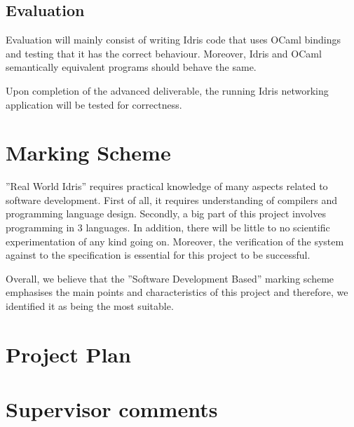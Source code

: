 \documentclass[a4paper]{report}
\begin{document}
\subsection{Evaluation}
Evaluation will mainly consist of writing Idris code that uses OCaml bindings
and testing that it has the correct behaviour.
Moreover, Idris and OCaml semantically equivalent programs should behave
the same.

Upon completion of the advanced deliverable, the running Idris networking
application will be tested for correctness.



\section{Marking Scheme}
''Real World Idris'' requires practical knowledge of many aspects related to
software development.
First of all, it requires understanding of compilers and programming language
design.
Secondly, a big part of this project involves programming in 3 languages. 
In addition, there will be little to no scientific experimentation of any kind
going on.
Moreover, the verification of the system against to the specification is
essential for this project to be successful.

Overall, we believe that the ''Software Development Based'' marking scheme
emphasises the main points and characteristics of this project and therefore,
we identified it as being the most suitable.




\section{Project Plan}



\section{Supervisor comments}




% 
% 
\end{document}
